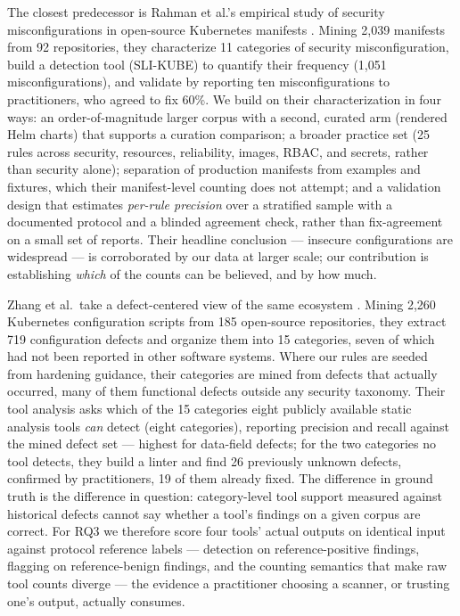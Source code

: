 \documentclass[pdflatex,sn-basic]{sn-jnl}
\begin{document}
The closest predecessor is Rahman et al.'s empirical study of security
misconfigurations in open-source Kubernetes manifests
\cite{Rahman2023}. Mining 2,039 manifests from 92 repositories,
they characterize 11 categories of security misconfiguration, build a
detection tool (SLI-KUBE) to quantify their frequency (1,051
misconfigurations), and validate by reporting ten misconfigurations to
practitioners, who agreed to fix 60\%. We build on their
characterization in four ways: an order-of-magnitude larger corpus with
a second, curated arm (rendered Helm charts) that supports a curation
comparison; a broader practice set (25 rules across security, resources,
reliability, images, RBAC, and secrets, rather than security alone);
separation of production manifests from examples and fixtures, which
their manifest-level counting does not attempt; and a validation design
that estimates \emph{per-rule precision} over a stratified sample with a
documented protocol and a blinded agreement check, rather than
fix-agreement on a small set of reports. Their headline conclusion ---
insecure configurations are widespread --- is corroborated by our data
at larger scale; our contribution is establishing \emph{which} of the
counts can be believed, and by how much.

Zhang et al.~take a defect-centered view of the same ecosystem
\cite{Zhang2026}. Mining 2,260 Kubernetes configuration scripts from
185 open-source repositories, they extract 719 configuration defects
and organize them into 15 categories, seven of which had not been
reported in other software systems. Where our rules are seeded from
hardening guidance, their categories are mined from defects that
actually occurred, many of them functional defects outside any security
taxonomy. Their tool analysis asks which of the 15 categories eight
publicly available static analysis tools \emph{can} detect (eight
categories), reporting precision and recall against the mined defect
set --- highest for data-field defects; for the two categories no tool
detects, they build a linter and find 26 previously unknown defects,
confirmed by practitioners, 19 of them already fixed. The difference in
ground truth is the difference in question: category-level tool support
measured against historical defects cannot say whether a tool's
findings on a given corpus are correct. For RQ3 we therefore score four
tools' actual outputs on identical input against protocol reference
labels --- detection on reference-positive findings, flagging on
reference-benign findings, and the counting semantics that make raw
tool counts diverge --- the evidence a practitioner choosing a scanner,
or trusting one's output, actually consumes.
\end{document}
